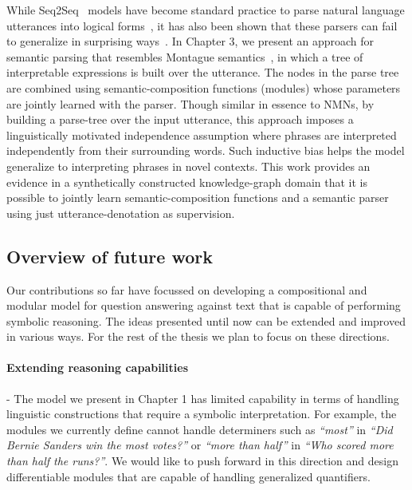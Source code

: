 \documentclass[main.tex]{subfiles}
\begin{document}
While Seq2Seq~\cite{seq2seq-2014,seq2seq-attn-2015} models have become standard practice to parse natural language utterances into logical forms~\cite{dong-lapata-2016,krishnamurthy-wikitable-2017,iyer-code-2018}, it has also been shown that these parsers can fail to generalize in surprising ways~\cite{text2sql-2018,sys-generalization-2018}.
In Chapter 3, we present an approach for semantic parsing that resembles Montague semantics~\cite{montague-semantics}, in which a tree of interpretable expressions is built over the utterance.  The nodes in the parse tree are combined using semantic-composition functions (modules) whose parameters are jointly learned with the parser.  Though similar in essence to NMNs, by building a parse-tree over the input utterance, this approach imposes a linguistically motivated independence assumption where phrases are interpreted independently from their surrounding words.  Such inductive bias helps the model generalize to interpreting phrases in novel contexts.  This work provides an evidence in a synthetically constructed knowledge-graph domain that it is possible to jointly learn semantic-composition functions and a semantic parser using just utterance-denotation as supervision.

\subsection{Overview of future work}

Our contributions so far have focussed on developing a compositional and modular model for question answering against text that is capable of performing symbolic reasoning. The ideas presented until now can be extended and improved in various ways. For the rest of the thesis we plan to focus on these directions.

\paragraph{Extending reasoning capabilities} - The model we present in Chapter 1 has limited capability in terms of handling linguistic constructions that require a symbolic interpretation.  For example, the modules we currently define cannot handle determiners such as \textit{``most''} in \textit{``Did Bernie Sanders win the most votes?''} or \textit{``more than half''} in \textit{``Who scored more than half the runs?''}. We would like to push forward in this direction and design differentiable modules that are capable of handling generalized quantifiers.
\end{document}
